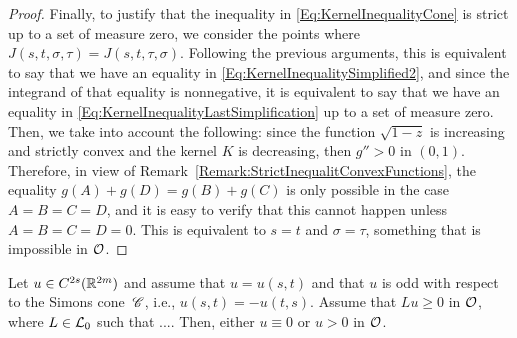 \begin{proof}
Finally, to justify that the inequality in \eqref{Eq:KernelInequalityCone} is strict up to a set of measure zero, we consider the points where $J(s,t,\sigma, \tau) = J(s,t,\tau,\sigma)$. Following the previous arguments, this is equivalent to say that we have an equality in \eqref{Eq:KernelInequalitySimplified2}, and since the integrand of that equality is nonnegative, it is equivalent to say that we have an equality in \eqref{Eq:KernelInequalityLastSimplification} up to a set of measure zero. Then, we take into account the following: since the function $\sqrt{1-z}$ is increasing and strictly convex and the kernel $K$ is decreasing, then $g''>0$ in $(0,1)$. Therefore, in view of Remark~\eqref{Remark:StrictInequalitConvexFunctions}, the equality $g(A) + g(D) = g(B) + g(C)$ is only possible in the case $A=B=C=D$, and it is easy to verify that this cannot happen unless $A=B=C=D=0$. This is equivalent to $s=t$ and $\sigma=\tau$, something that is impossible in $\mathcal{O}$.

\end{proof}


\begin{proposition}
\label{Prop:StrongMaximumPrincipleForOddFunctions}
Let $u\in C^{2s}(\mathbb{R}^{2m})$  and assume that $u = u(s,t)$ and that $u$ is odd with respect to the Simons cone~$\mathscr{C}$, i.e., $u(s,t) = - u(t,s)$. Assume that $Lu \geq 0$ in $\mathcal{O}$, where $L \in \mathcal{L}_0$ such that .... Then, either $u\equiv 0$ or $u > 0$ in $\mathcal{O}$.
\end{proposition}

